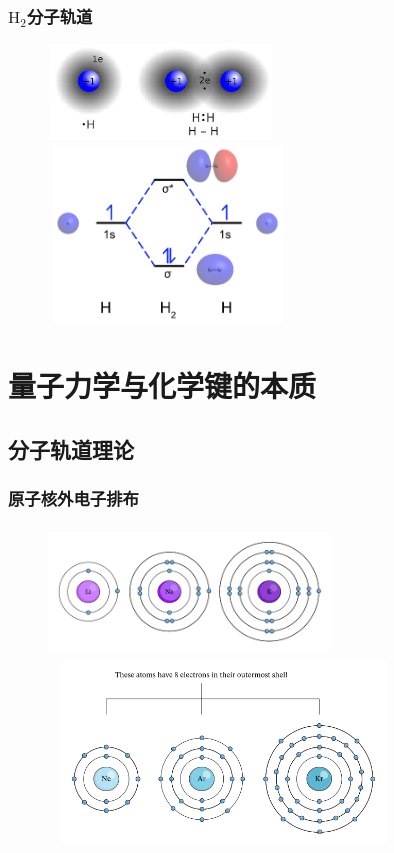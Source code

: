 \frame
{
	\frametitle{$\mathrm{H}_2$分子轨道}
\begin{figure}[h!]
\centering
\vspace{-15.5pt}
\includegraphics[height=1.0in,width=2.35in,viewport=0 0 350 150,clip]{Figures/H-bonding.jpeg}
\includegraphics[height=1.85in,width=2.50in,viewport=0 0 120 90,clip]{Figures/Molecular-orbital-diagram-H2.png}
\label{MO:H2}
\end{figure}
}

\section{量子力学与化学键的本质}
\subsection{分子轨道理论}
\frame
{
	\frametitle{原子核外电子排布}
\begin{figure}[h!]
\vspace*{-0.35in}
\centering
\includegraphics[height=1.35in,width=2.95in,viewport=0 0 500 230,clip]{Figures/Li-Na-K.png}
\includegraphics[height=1.92in,width=3.65in,viewport=0 0 500 275,clip]{Figures/Ne-Ar-Kr.png}
\label{Electron_in_atom}
\end{figure}
}

